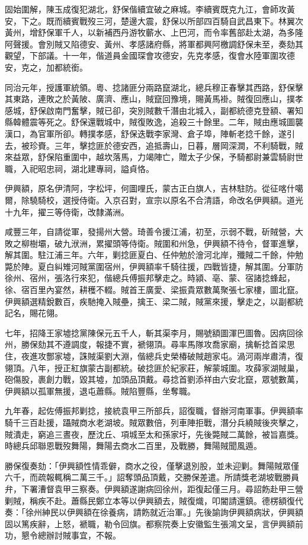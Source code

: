 \begin{pinyinscope}
固始圍解，陳玉成復犯湖北，舒保偕續宜破之麻城。李續賓既克九江，會師攻黃安，下之。既而續賓戰歿三河，楚邊大震，舒保以所部四百騎自武昌東下。林翼次黃州，增舒保軍千人，以新補西丹游牧蘄水、上巴河，而令率舊部赴太湖，為多隆阿聲援。會別賊又陷德安、黃州、孝感諸府縣，將軍都興阿檄調舒保未至，奏劾其觀望，下部議。十一年，偕道員金國琛會攻德安，先克孝感，復會水陸軍圍攻德安，克之，加都統銜。

同治元年，授護軍統領。粵、捻諸匪分兩路竄湖北，總兵穆正春擊其西路，舒保擊其東路，連敗之於黃陂、廣濟、應山，賊竄回豫境，賜黃馬褂。賊復回應山，撲孝感城，舒保啟南門奮擊，賊已卻，突別賊數千潛由北城入，副都統德克登額、署知縣韓體震等死之。舒保還戰城中，賊復敗逸，追殺三十餘里。二年，賊由應城圖襲漢口，為官軍所卻。轉撲孝感，舒保迭戰李家灣、倉子埠，陣斬老捻千餘，遂引去，被珍賚。三年，擊捻匪於德安西，追抵壽山，日暮，層岡深澗，不利騎戰，賊來益眾，舒保陷重圍中，越坎落馬，力竭陣亡，贈太子少保，予騎都尉兼雲騎尉世職，入祀昭忠祠，湖北建專祠，謚貞恪。

伊興額，原名伊清阿，字松坪，何圖哩氏，蒙古正白旗人，吉林駐防。從征喀什噶爾，除驍騎校，選授侍衛。入京召對，宣宗以原名不合清語，命改名伊興額。道光十九年，擢三等侍衛，改隸滿洲。

咸豐三年，自請從軍，發揚州大營。琦善令援江浦，初至，示弱不戰，斫賊營，大敗之柳樹壩，破九洑洲，累擢頭等侍衛。賊圍和州急，伊興額不待令，督軍進擊，解其圍。駐江浦三年。六年，剿捻匪夏白、任仲勉於澮河北岸，殲賊二千餘，仲勉斃於陣。夏白糾雉河賊黨圍宿州，伊興額率千騎往援，四戰皆捷，解其圍。分軍防徐州、宿州，張洛行來犯，偕總兵傅振邦擊走之。時潁、亳、蒙、宿諸捻蜂起，徐、宿百里內宴然，耕穫不輟。賊首王廣愛、梁振貴眾數萬聚張七家樓，圖北竄。伊興額選精銳數百，疾馳掩入賊壘，擒王、梁二賊，賊黨來援，擊走之，以副都統記名，賜花翎。

七年，招降王家墟捻黨陳保元五千人，斬其渠李月，賜號額圖渾巴圖魯。因病回徐州，勝保劾其不遵調度，報捷不實，褫翎頂。尋率馬隊攻喬家廟，擒斬捻首梁思住，夜進攻酆家墟，誅賊渠劉大淵，偕總兵史榮椿破賊趙家屯。渦河兩岸肅清，復翎頂。八年，授正紅旗蒙古副都統。破捻匪於紀家莊，解蒙城圍。攻薛家湖賊巢，砲傷股，裹創力戰，毀其墟，加頭品頂戴。尋捻首劉添祥由六安北竄，眾號數萬，伊興額以孤軍無援，退屯蕭縣。賊陷豐縣，坐奪職。

九年春，起佐傅振邦剿捻，接統袁甲三所部兵，詔復職，督辦河南軍事。伊興額率騎千三百赴援，躡賊商水老湖坡。賊眾數倍，列車陣拒戰，潛分兵繞賊後夾擊之，賊潰走，窮追三晝夜，歷沈丘、項城至太和孫家圩，先後斃賊二萬餘，被旨嘉獎。時總兵邱聯恩戰歿舞陽，舞陽去商水二百里，及戰勝，舞陽賊聞風遁。

勝保復奏劾：「伊興額性情乖僻，商水之役，僅擊退別股，並未迎剿。舞陽賊眾僅六千，而疏報輒稱二萬三千。」詔奪頭品頂戴，交勝保差遣。所請獎老湖坡戰勝員弁，下署漕督袁甲三察奏。伊興額遂謝病回徐州，距復起僅三月。尋詔飭赴甲三營剿賊，稱疾不赴。蕭縣民鄭立本等以伊興額去，賊復熾，叩閽請還鎮。德楞額復代奏：「徐州紳民以伊興額在徐養病，請飭就近治軍。」先後諭詢伊興額病狀，伊興額固以篤疾辭，上怒，褫職，勒令回旗。都察院奏上安徽監生張鴻文呈，言伊興額前功，懇令總辦討賊事宜，不報。


\end{pinyinscope}
